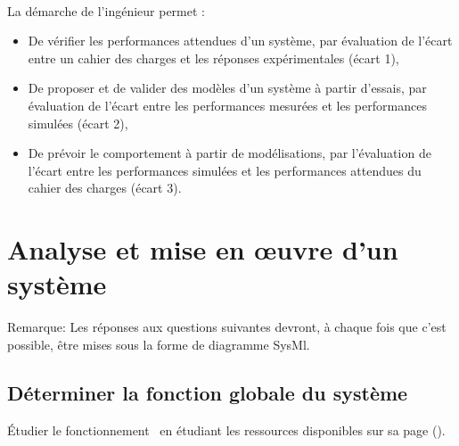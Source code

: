 



 \\

\graphicspath{{../../img/}}
\begin{center}
\def\svgwidth{\columnwidth}

\end{center}

La démarche de l’ingénieur permet :
\begin{itemize}
 \item De vérifier les performances attendues d’un système, par évaluation de l’écart entre un cahier des charges et les réponses expérimentales (écart 1),
 \item De proposer et de valider des modèles d’un système à partir d’essais, par évaluation de l’écart entre les performances mesurées et les performances simulées (écart 2),
 \item De prévoir le comportement à partir de modélisations, par l’évaluation de l’écart entre les performances simulées et les performances attendues du cahier des charges (écart 3).
\end{itemize}


\newpage

\section{Analyse et mise en \oe uvre d'un système} 

Remarque: Les réponses aux questions suivantes devront, à chaque fois que c'est possible, être mises sous la forme de diagramme SysMl.

\subsection{Déterminer la fonction globale du système} 

Étudier le fonctionnement \dusysteme\ en étudiant les ressources disponibles sur sa page (\urlsysteme).

